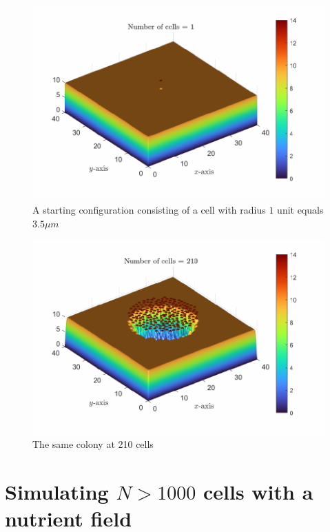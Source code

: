 \begin{figure}[h]
\centering
\includegraphics[width=1\textwidth]{chapter1/figures/ColonySimulationDemoNutrientField_N_1.pdf}
\caption{A starting configuration consisting of a cell with radius $1$ unit equals $3.5 \mu m$}
\label{fig:ColonySimulationStartingCellNutrientField}
\end{figure}
\filbreak


\begin{figure}[h]
\centering
\includegraphics[width=1\textwidth]{chapter1/figures/ColonySimulationDemoNutrientField_N_210.pdf}
\caption{The same colony at 210 cells}
\label{fig:ColonySimulationNutrientFieldN210}
\end{figure}
\filbreak

\section{Simulating $N > 1000$ cells with a nutrient field}

